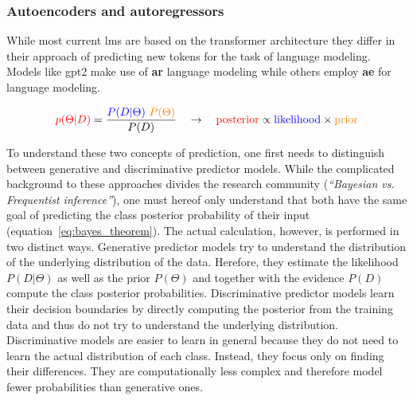 \subsubsection{Autoencoders and autoregressors}
\label{sub:autoencoders_and_autoregressors}

While most current \gls{lm}s are based on the transformer architecture they differ in their approach of predicting new tokens for the task of language modeling. Models like \gls{gpt2} make use of \textbf{\gls{ar}} language modeling while others employ \textbf{\gls{ae}} for language modeling.

\begin{align}
	\label{eq:bayes_theorem}
	\mathbin{\textcolor{red}{p(\Theta|D)}} = \frac{\mathbin{\textcolor{blue}{P(D|\Theta)}} \ \mathbin{\textcolor{orange}{P(\Theta)}} }{P(D)} \quad \rightarrow \quad
	\textcolor{red}{\text{posterior}} \propto \textcolor{blue}{\text{likelihood}} \times \textcolor{orange}{\text{prior}}
\end{align}

To understand these two concepts of prediction, one first needs to distinguish between generative and discriminative predictor models. While the complicated background to these approaches divides the research community (\textit{``Bayesian vs. Frequentist inference''}), one must hereof only understand that both have the same goal of predicting the class posterior probability of their input (equation~\ref{eq:bayes_theorem}). The actual calculation, however, is performed in two distinct ways. Generative predictor models try to understand the distribution of the underlying distribution of the data. Herefore, they estimate the likelihood $ P(D|\Theta) $ as well as the prior $ P(\Theta) $ and together with the evidence $ P(D) $ compute the class posterior probabilities. Discriminative predictor models learn their decision boundaries by directly computing the posterior from the training data and thus do not try to understand the underlying distribution. Discriminative models are easier to learn in general because they do not need to learn the actual distribution of each class. Instead, they focus only on finding their differences. They are computationally less complex and therefore model fewer probabilities than generative ones.

